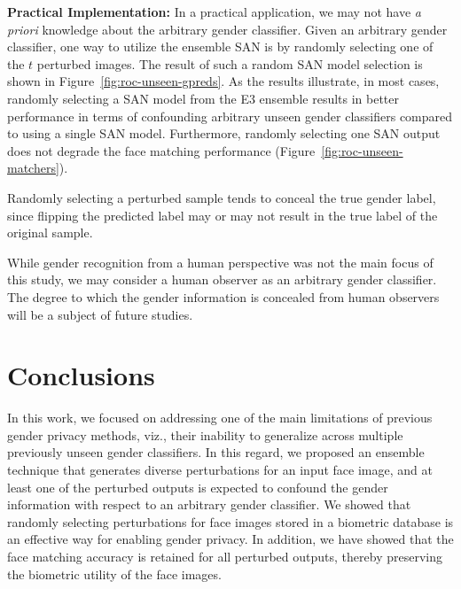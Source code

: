 \documentclass[10pt,twocolumn,letterpaper]{article}
\begin{document}
 
{\bf Practical Implementation:} In a practical application, we may not have \emph{a priori} knowledge about the arbitrary gender classifier. Given an arbitrary gender classifier, one way to utilize the ensemble SAN is by randomly selecting one of the $t$ perturbed images. The result of such a random SAN model selection is shown in Figure~\ref{fig:roc-unseen-gpreds}. As the results illustrate, in most cases, randomly selecting a SAN model from the E3 ensemble results in better performance in terms of confounding arbitrary unseen gender classifiers compared to using a single SAN model. Furthermore, randomly selecting one SAN output does not degrade the face matching performance (Figure~\ref{fig:roc-unseen-matchers}).

Randomly selecting a perturbed sample tends to conceal the true gender label, since flipping the predicted label may or may not result in the true label of the original sample.

While gender recognition from a human perspective was not the main focus of this study, we may consider a human observer as an arbitrary gender classifier. The degree to which the gender information is concealed from human observers will be a subject of future studies. 


\section{Conclusions}

In this work, we focused on addressing one of the main limitations of previous gender privacy methods, viz., their inability to generalize across multiple previously unseen gender classifiers. In this regard, we proposed an ensemble technique that generates diverse perturbations for an input face image, and at least one of the perturbed outputs is expected to confound the gender information with respect to an arbitrary gender classifier. We showed that randomly selecting perturbations for face images stored in a biometric database is an effective way for enabling gender privacy. In addition, we have showed that the face matching accuracy is retained for all perturbed outputs, thereby preserving the biometric utility of the face images.
\end{document}
